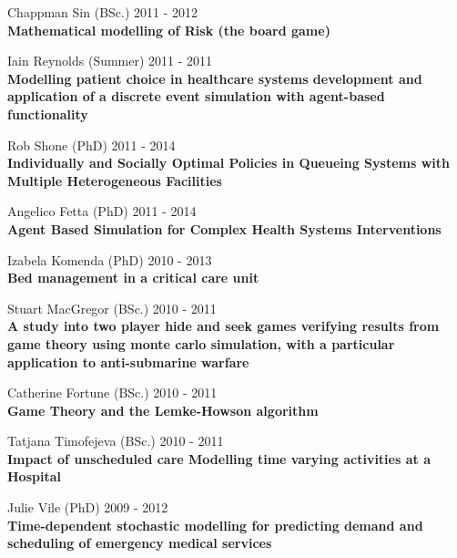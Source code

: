 \documentclass[10pt]{res} %
\begin{document}
\begin{resume}
\begin{etaremune}
\item
    Chappman Sin (BSc.) \hfill 2011 -
    2012\\
\textbf{Mathematical modelling of Risk (the board game)}\\

\item
    Iain Reynolds (Summer) \hfill 2011 -
    2011\\
\textbf{Modelling patient choice in healthcare systems development and application of a discrete event simulation with agent-based functionality}\\

\item
    Rob Shone (PhD) \hfill 2011 -
    2014\\
\textbf{Individually and Socially Optimal Policies in Queueing Systems with Multiple Heterogeneous Facilities}\\

\item
    Angelico Fetta (PhD) \hfill 2011 -
    2014\\
\textbf{Agent Based Simulation for Complex Health Systems Interventions}\\

\item
    Izabela Komenda (PhD) \hfill 2010 -
    2013\\
\textbf{Bed management in a critical care unit}\\

\item
    Stuart MacGregor (BSc.) \hfill 2010 -
    2011\\
\textbf{A study into two player hide and seek games verifying results from game theory using monte carlo simulation, with a particular application to anti-submarine warfare}\\

\item
    Catherine Fortune (BSc.) \hfill 2010 -
    2011\\
\textbf{Game Theory and the Lemke-Howson algorithm}\\

\item
    Tatjana Timofejeva (BSc.) \hfill 2010 -
    2011\\
\textbf{Impact of unscheduled care Modelling time varying activities at a Hospital}\\

\item
    Julie Vile (PhD) \hfill 2009 -
    2012\\
\textbf{Time-dependent stochastic modelling for predicting demand and scheduling of emergency medical services}\\


\end{etaremune}
\end{resume}
\end{document}
